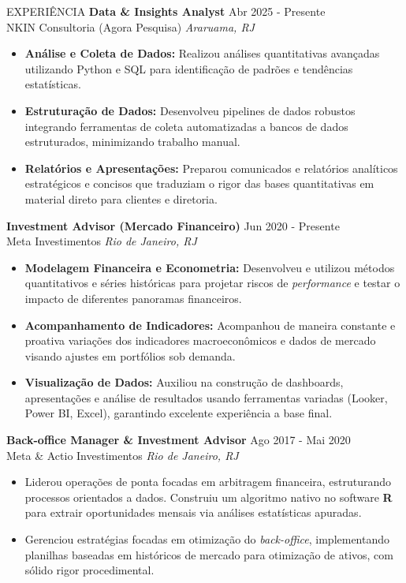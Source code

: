 \documentclass{resume}
\begin{document}
\vspace{-1em}
\begin{rSection}{EXPERIÊNCIA}
\textbf{Data \& Insights Analyst} \hfill Abr 2025 - Presente\\
NKIN Consultoria (Agora Pesquisa) \hfill \textit{Araruama, RJ}
{\footnotesize
\begin{itemize}
    \itemsep -3pt {} 
     \item \textbf{Análise e Coleta de Dados:} Realizou análises quantitativas avançadas utilizando Python e SQL para identificação de padrões e tendências estatísticas.
     \item \textbf{Estruturação de Dados:} Desenvolveu pipelines de dados robustos integrando ferramentas de coleta automatizadas a bancos de dados estruturados, minimizando trabalho manual.
     \item \textbf{Relatórios e Apresentações:} Preparou comunicados e relatórios analíticos estratégicos e concisos que traduziam o rigor das bases quantitativas em material direto para clientes e diretoria.
 \end{itemize}
}

\textbf{Investment Advisor (Mercado Financeiro)} \hfill Jun 2020 - Presente\\
Meta Investimentos \hfill \textit{Rio de Janeiro, RJ}
{\footnotesize
\begin{itemize}
    \itemsep -3pt {} 
     \item \textbf{Modelagem Financeira e Econometria:} Desenvolveu e utilizou métodos quantitativos e séries históricas para projetar riscos de \textit{performance} e testar o impacto de diferentes panoramas financeiros.
     \item \textbf{Acompanhamento de Indicadores:} Acompanhou de maneira constante e proativa variações dos indicadores macroeconômicos e dados de mercado visando ajustes em portfólios sob demanda.
     \item \textbf{Visualização de Dados:} Auxiliou na construção de dashboards, apresentações e análise de resultados usando ferramentas variadas (Looker, Power BI, Excel), garantindo excelente experiência a base final.
 \end{itemize}
}

\textbf{Back-office Manager \& Investment Advisor} \hfill Ago 2017 - Mai 2020\\
Meta \& Actio Investimentos \hfill \textit{Rio de Janeiro, RJ}
{\footnotesize
\begin{itemize}
    \itemsep -3pt {} 
    \item Liderou operações de ponta focadas em arbitragem financeira, estruturando processos orientados a dados. Construiu um algoritmo nativo no software \textbf{R} para extrair oportunidades mensais via análises estatísticas apuradas.
    \item Gerenciou estratégias focadas em otimização do \textit{back-office}, implementando planilhas baseadas em históricos de mercado para otimização de ativos, com sólido rigor procedimental.
\end{itemize}
}


\end{rSection}
\end{document}
